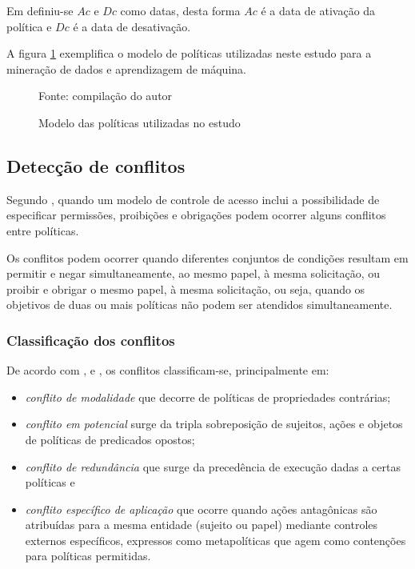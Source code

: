 Em \cite{sarkis2017} definiu-se $ Ac $ e $ Dc $ como datas, desta forma $ Ac $ é a data de ativação da política e $ Dc $ é a data de desativação.

A figura \ref{fig:modelo_politica} exemplifica o modelo de políticas utilizadas neste estudo para a mineração de dados e aprendizagem de máquina.

\begin{figure}[h!]
	\centering
	\caption{Modelo das políticas utilizadas no estudo}
	
	{\scriptsize Fonte: compilação do autor}
	\label{fig:modelo_politica}
\end{figure}

\subsection{Detecção de conflitos} \label{deteccao_conflitos}

Segundo \cite{kalam_organization_2003}, quando um modelo de controle de acesso inclui a possibilidade de especificar permissões, proibições e obrigações podem ocorrer alguns conflitos entre políticas. 

Os conflitos podem ocorrer quando diferentes conjuntos de condições resultam em permitir e negar simultaneamente, ao mesmo papel, à mesma solicitação, ou proibir e obrigar o mesmo papel, à mesma solicitação, ou seja, quando os objetivos de duas ou mais políticas não podem ser atendidos simultaneamente. \cite{cuppens_high_2007}

\subsubsection{Classificação dos conflitos}

De acordo com \cite{cuppens_high_2007}, \cite{sloman_security_2002} e \cite{lupu_conflicts_1999}, os conflitos classificam-se, principalmente em: \begin{itemize}
	\item \textit{conflito de modalidade} que decorre de políticas de propriedades contrárias; 
	\item \textit{conflito em potencial} surge da tripla sobreposição de sujeitos, ações e objetos de políticas de predicados opostos;
	\item \textit{conflito de redundância} que surge da precedência de execução dadas a certas políticas e
	\item \textit{conflito específico de aplicação} que ocorre quando ações antagônicas são atribuídas para a mesma entidade (sujeito ou papel) mediante controles externos específicos, expressos como metapolíticas que agem como contenções para políticas permitidas.
\end{itemize}

